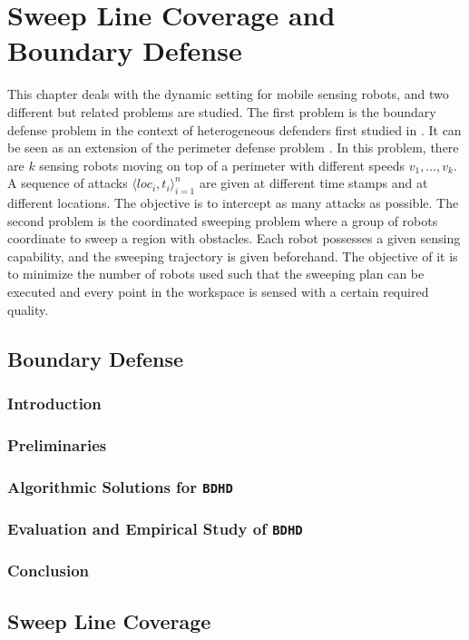 
\chapter{Sweep Line Coverage and Boundary Defense}
\thispagestyle{myheadings}

This chapter deals with the dynamic setting for mobile sensing robots, 
and two different but related problems are studied. 
The first problem is the boundary defense problem in the context of heterogeneous defenders first studied in \cite{adler2022role}.
It can be seen as an extension of the perimeter defense problem \cite{shishika2020review}. 
In this problem, there are $k$ sensing robots moving on top of a perimeter with different speeds $v_1,\dots,v_k$.
A sequence of attacks $\langle loc_i, t_i \rangle_{i=1}^{n}$ are given at different time stamps and at different locations.
The objective is to intercept as many attacks as possible.
The second problem is the coordinated sweeping problem where a group of robots coordinate to sweep a region 
with obstacles. Each robot possesses a given sensing capability, and the sweeping trajectory is 
given beforehand. The objective of it is to minimize the number of robots used such that the sweeping plan 
can be executed and every point in the workspace is sensed with a certain required quality. 

\section{Boundary Defense}
\def\prob{{\texttt{{BDHD}}}\xspace}
\def\ours{{{{EDP}}}\xspace}
\def\oours{{{{OEDP}}}\xspace}
\subsection{Introduction}
\label{sec:bd-intro}
\subsection{Preliminaries}\label{sec:bd-preliminary}

\subsection{Algorithmic Solutions for \prob}\label{sec:bd-algorithm}

\subsection{Evaluation and Empirical Study of \prob}\label{sec:bd-evaluation}

\subsection{Conclusion}\label{sec:bd-conclusion}



\section{Sweep Line Coverage}






